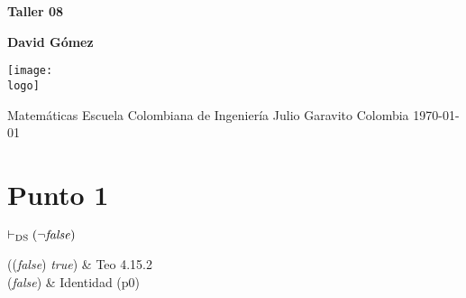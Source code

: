 \documentclass{article}
\newcommand{\logo}{C:/Users/usuario/Documents/U/logo-eci.jpg}
\newcommand{\titlename}{Taller 08}%
\renewcommand{\author}{David Gómez}%
\begin{document}
\begin{titlepage}
    \begin{center}
        \vspace*{1cm}

        \textbf{\Huge{\titlename}}

        \vspace{1.5cm}

        \textbf{\large{\author}
}
        \vspace{4cm}

        \texttt{[image: \\logo]}

        \vspace{4cm}

        Matemáticas\linebreak
        Escuela Colombiana de Ingeniería Julio Garavito\linebreak
        Colombia\linebreak
        \today

    \end{center}
\end{titlepage}
\clearpage
\tableofcontents
\clearpage

\section{Punto 1}
\begin{logicenv}{$\vdash_{\text{DS}} (\neg \textrm{\textit{false}})$}
    \begin{logic}
        ((\neg \textrm{\textit{false}}) \equiv \textrm{\textit{true}}) & Teo 4.15.2\\
        (\neg \textrm{\textit{false}}) & Identidad (p0)
    \end{logic}
\end{logicenv}
\end{document}
